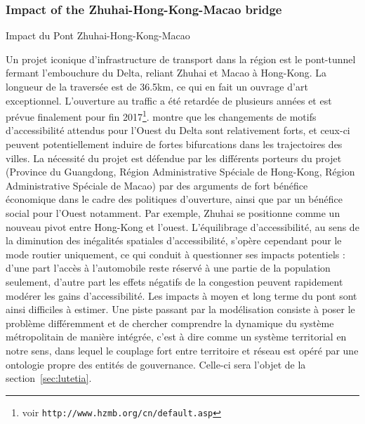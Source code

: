 \subsubsection{Impact of the Zhuhai-Hong-Kong-Macao bridge}{Impact du Pont Zhuhai-Hong-Kong-Macao}

Un projet iconique d'infrastructure de transport dans la région est le pont-tunnel fermant l'embouchure du Delta, reliant Zhuhai et Macao à Hong-Kong. La longueur de la traversée est de 36.5km, ce qui en fait un ouvrage d'art exceptionnel. L'ouverture au traffic a été retardée de plusieurs années et est prévue finalement pour fin 2017\footnote{voir \texttt{http://www.hzmb.org/cn/default.asp}}. \cite{zhou2016medium} montre que les changements de motifs d'accessibilité attendus pour l'Ouest du Delta sont relativement forts, et ceux-ci peuvent potentiellement induire de fortes bifurcations dans les trajectoires des villes. La nécessité du projet est défendue par les différents porteurs du projet (Province du Guangdong, Région Administrative Spéciale de Hong-Kong, Région Administrative Spéciale de Macao) par des arguments de fort bénéfice économique dans le cadre des politiques d'ouverture, ainsi que par un bénéfice social pour l'Ouest notamment. Par exemple, Zhuhai se positionne comme un nouveau pivot entre Hong-Kong et l'ouest. L'équilibrage d'accessibilité, au sens de la diminution des inégalités spatiales d'accessibilité, s'opère cependant pour le mode routier uniquement, ce qui conduit à questionner ses impacts potentiels : d'une part l'accès à l'automobile reste réservé à une partie de la population seulement, d'autre part les effets négatifs de la congestion peuvent rapidement modérer les gains d'accessibilité. Les impacts à moyen et long terme du pont sont ainsi difficiles à estimer. Une piste passant par la modélisation consiste à poser le problème différemment et de chercher comprendre la dynamique du système métropolitain de manière intégrée, c'est à dire comme un système territorial en notre sens, dans lequel le couplage fort entre territoire et réseau est opéré par une ontologie propre des entités de gouvernance. Celle-ci sera l'objet de la section~\ref{sec:lutetia}.




\bigskip


